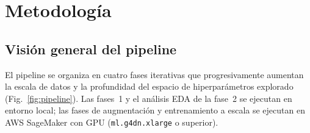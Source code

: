 \documentclass[journal]{IEEEtran}
\begin{document}
\section{Metodología}
\label{sec:metodologia}

\subsection{Visión general del pipeline}

El pipeline se organiza en cuatro fases iterativas que progresivamente aumentan
la escala de datos y la profundidad del espacio de hiperparámetros explorado
(Fig.~\ref{fig:pipeline}). Las fases~1 y el análisis EDA de la fase~2 se
ejecutan en entorno local; las fases de augmentación y entrenamiento a escala
se ejecutan en AWS SageMaker con GPU (\texttt{ml.g4dn.xlarge} o superior).
\end{document}
